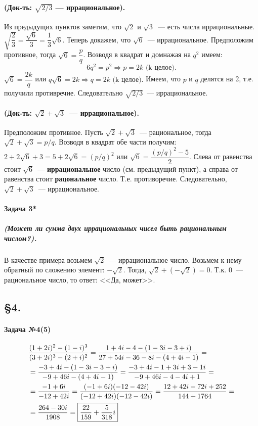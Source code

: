 \documentclass[a4paper,12pt]{report}
\begin{document}
\paragraph{(Док-ть: $ \sqrt{2/3} $ --- иррациональное).}
Из предыдущих пунктов заметим, что $ \sqrt{2} $ и
$ \sqrt{3} $~--- есть числа иррациональные.
$ \sqrt{\dfrac{2}{3}}=\dfrac{\sqrt{6}}{3}=\dfrac{1}{3}\sqrt{6} $.
Теперь докажем, что $ \sqrt{6} $~--- иррациональное. 
Предположим противное, тогда $ \sqrt{6}=\dfrac{p}{q} $.
Возводя в квадрат и домнажая на $ q^2 $ имеем: $$ 6q^2=p^2 
\Rightarrow p=2k \text{ (k целое).}$$ 
$ \sqrt{6}=\dfrac{2k}{q} $ или $ q\sqrt{6}=2k \Rightarrow q=2k\text{ (k целое).}$  
Имеем, что $ p $ и $ q $ делятся на 2, т.е. получили противречие. 
Следовательно $ \sqrt{2/3} $~--- иррациональное.

\paragraph{(Док-ть: $ \sqrt{2} + \sqrt{3} $~--- иррациональное).}
Предположим противное.
Пусть $ \sqrt{2} + \sqrt{3} $~--- рациональное, тогда
$ \sqrt{2} + \sqrt{3} = p/q $. Возводя в квадрат обе части получим: 
$ 2 + 2\sqrt{6} + 3 = 
5 + 2\sqrt{6} = (p/q)^2 $ или 
$ \sqrt{6}= \dfrac{(p/q)^2 - 5}{2} $.  
Слева от равенства стоит $ \sqrt{6} $~--- \textbf{иррациональное} 
число (см. предыдущий пункт), а справа от равенства 
стоит \textbf{рацональное} число. Т.е. противоречие.
Следовательно, $ \sqrt{2} + \sqrt{3} $~--- иррациональное.

\paragraph{Задача 3*}
\subparagraph{(Может ли сумма двух иррациональных чисел быть рациональным числом?).} 
В качестве примера возьмем $ \sqrt{2} $~--- иррациональное число.
Возьмем к нему обратный по сложению элемент: $ -\sqrt{2} $. Тогда,
$ \sqrt{2} + (-\sqrt{2}) = 0 $. Т.к. 0~--- рациональное число, то 
ответ: <<Да, может>>.

\subsection{\S4.\\}

\paragraph{Задача №4(5)}

\begin{align*}
	&\dfrac{(1+2i)^2-(1-i)^3}{(3+2i)^3-(2+i)^2}=
	\dfrac{1+4i-4-(1-3i-3+i)}{27+54i-36-8i-(4+4i-1)}=\\
	&=\dfrac{-3+4i-(1-3i-3+i)}{-9+46i-(4+4i-1)}=
	\dfrac{-3+4i-1+3i+3-1i}{-9+46i-4-4i+1}=\\
	&=\dfrac{-1+6i}{-12+42i}=
	\dfrac{(-1+6i)(-12-42i)}{(-12+42i)(-12-42i)}=
	\dfrac{12+42i-72i+252}{144+1764}=\\
	&=\dfrac{264-30i}{1908}=
	\fbox{$ \dfrac{22}{159}+\dfrac{5}{318}i $} 
\end{align*}
\end{document}
